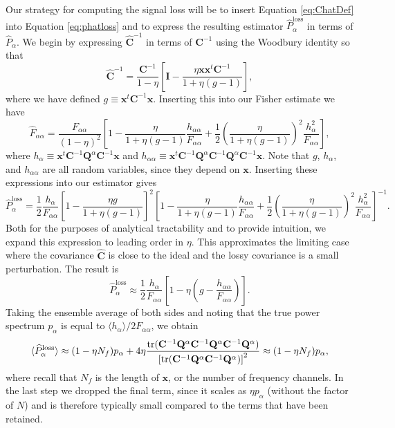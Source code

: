 \documentclass[preprint2,numberedappendix,tighten]{aastex6}
\newcommand{\x}{\mathbf{x}}
\newcommand{\C}{\mathbf{C}}
\newcommand{\Chat}{\mathbf{\widehat{C}}}
\newcommand{\Q}{\mathbf{Q}}
\newcommand{\I}{\mathbf{I}}
\begin{document}
Our strategy for computing the signal loss will be to insert Equation \eqref{eq:ChatDef} into Equation \eqref{eq:phatloss} and to express the resulting estimator $\widehat{P}_\alpha^\textrm{loss}$ in terms of $\widehat{P}_\alpha$. We begin by expressing $\Chat^{-1}$ in terms of $\C^{-1}$ using the Woodbury identity so that
\begin{equation}
\Chat^{-1} = \frac{\C^{-1}}{1-\eta} \left[ \I - \frac{\eta \x \x^t \C^{-1}}{1+ \eta (g-1)}\right],
\end{equation}
where we have defined $g \equiv \x^t \C^{-1} \x$. Inserting this into our Fisher estimate we have
\begin{equation}
\widehat{F}_{\alpha \alpha} = \frac{F_{\alpha \alpha}}{(1-\eta)^2} \left[ 1 -\frac{\eta }{1+ \eta (g-1)} \frac{h_{\alpha \alpha}}{F_{\alpha \alpha}} + \frac{1}{2} \left( \frac{\eta }{1+ \eta (g-1)} \right)^2 \frac{h_\alpha^2}{F_{\alpha \alpha}}\right],
\end{equation}
where $h_\alpha \equiv \x^t \C^{-1} \Q^\alpha \C^{-1} \x $ and $h_{\alpha \alpha} \equiv \x^t \C^{-1} \Q^\alpha \C^{-1} \Q^\alpha \C^{-1}\x $. Note that $g$, $h_\alpha$, and $h_{\alpha \alpha}$ are all random variables, since they depend on $\x$. Inserting these expressions into our estimator gives
\begin{equation}
\label{eq:phatlossexpanded}
\widehat{P}_\alpha^\textrm{loss} = \frac{1}{2} \frac{h_\alpha}{F_{\alpha \alpha}} \left[ 1 - \frac{\eta g}{1+ \eta (g-1)}\right]^2  \left[ 1 -\frac{\eta }{1+ \eta (g-1)} \frac{h_{\alpha \alpha}}{F_{\alpha \alpha}} + \frac{1}{2} \left( \frac{\eta }{1+ \eta (g-1)} \right)^2 \frac{h_\alpha^2}{F_{\alpha \alpha}}\right]^{-1}.
\end{equation}
Both for the purposes of analytical tractability and to provide intuition, we expand this expression to leading 
order in $\eta$. This approximates the limiting case where the covariance $\Chat$ is close to the ideal and the 
lossy covariance is a small perturbation.  The result is
\begin{equation}
\widehat{P}_\alpha^\textrm{loss} \approx \frac{1}{2} \frac{h_\alpha}{F_{\alpha \alpha}} \left[ 1 - \eta \left( g - \frac{h_{\alpha \alpha}}{F_{\alpha \alpha}}\right)\right].
\end{equation}
Taking the ensemble average of both sides and noting that the true power spectrum $p_\alpha$ is equal to $\langle h_\alpha \rangle / 2 F_{\alpha \alpha}$, we obtain
\begin{equation}
\langle \widehat{P}_\alpha^\textrm{loss} \rangle \approx (1- \eta N_f) p_\alpha + 4 \eta \frac{\rm{tr} (\C^{-1} \Q^\alpha \C^{-1} \Q^\alpha \C^{-1} \Q^\alpha )}{\left[ \rm{tr} (\C^{-1} \Q^\alpha \C^{-1} \Q^\alpha  ) \right]^2} \approx (1- \eta N_f) p_\alpha,
\end{equation}
where recall that $N_f$ is the length of $\x$, or the number of frequency channels. In the last step we dropped the final term, since it scales as $\eta p_\alpha$ (without the factor of $N$) and is therefore typically small compared to the terms that have been retained.
\end{document}
